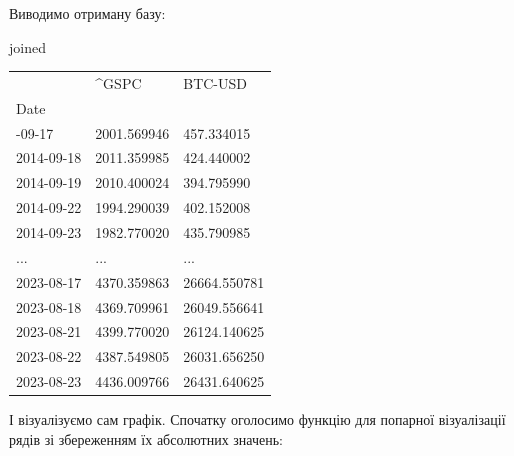 \documentclass[
  letterpaper,
]{report}
\newenvironment{Shaded}{\begin{snugshade}}{\end{snugshade}}
\newcommand{\NormalTok}[1]{\textcolor[rgb]{0.00,0.23,0.31}{#1}}
\begin{document}
Виводимо отриману базу:

\begin{Shaded}
\begin{Highlighting}[]
\NormalTok{joined}
\end{Highlighting}
\end{Shaded}

\begin{longtable}[]{@{}lll@{}}
\toprule\noalign{}
& \^{}GSPC & BTC-USD \\
Date & & \\
\midrule\noalign{}
\endhead
\bottomrule\noalign{}
\endlastfoot
2014-09-17 & 2001.569946 & 457.334015 \\
2014-09-18 & 2011.359985 & 424.440002 \\
2014-09-19 & 2010.400024 & 394.795990 \\
2014-09-22 & 1994.290039 & 402.152008 \\
2014-09-23 & 1982.770020 & 435.790985 \\
... & ... & ... \\
2023-08-17 & 4370.359863 & 26664.550781 \\
2023-08-18 & 4369.709961 & 26049.556641 \\
2023-08-21 & 4399.770020 & 26124.140625 \\
2023-08-22 & 4387.549805 & 26031.656250 \\
2023-08-23 & 4436.009766 & 26431.640625 \\
\end{longtable}

І візуалізуємо сам графік. Спочатку оголосимо функцію для попарної
візуалізації рядів зі збереженням їх абсолютних значень:
\end{document}
